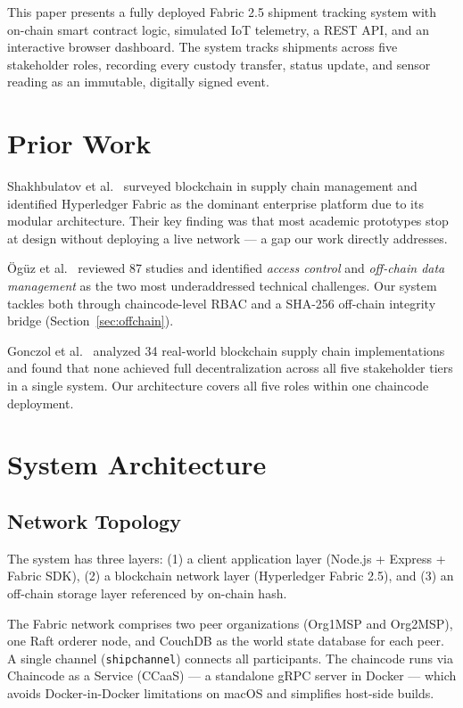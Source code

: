 \documentclass[conference]{IEEEtran}
\begin{document}
This paper presents a fully deployed Fabric 2.5 shipment tracking system
with on-chain smart contract logic, simulated IoT telemetry, a REST API,
and an interactive browser dashboard.  The system tracks shipments across
five stakeholder roles, recording every custody transfer, status update, and
sensor reading as an immutable, digitally signed event.

\section{Prior Work}

Shakhbulatov et al.\ \cite{shakhbulatov2020} surveyed blockchain in supply
chain management and identified Hyperledger Fabric as the dominant enterprise
platform due to its modular architecture.  Their key finding was that most
academic prototypes stop at design without deploying a live network --- a gap
our work directly addresses.

\"{O}g\"{u}z et al.\ \cite{oguz2024} reviewed 87 studies and identified
\textit{access control} and \textit{off-chain data management} as the two
most underaddressed technical challenges.  Our system tackles both through
chaincode-level RBAC and a SHA-256 off-chain integrity bridge
(Section~\ref{sec:offchain}).

Gonczol et al.\ \cite{gonczol2020} analyzed 34 real-world blockchain supply
chain implementations and found that none achieved full decentralization
across all five stakeholder tiers in a single system.  Our architecture
covers all five roles within one chaincode deployment.

\section{System Architecture}

\subsection{Network Topology}

The system has three layers: (1) a client application layer (Node.js +
Express + Fabric SDK), (2) a blockchain network layer (Hyperledger Fabric
2.5), and (3) an off-chain storage layer referenced by on-chain hash.

The Fabric network comprises two peer organizations (Org1MSP and Org2MSP),
one Raft orderer node, and CouchDB as the world state database for each
peer.  A single channel (\texttt{shipchannel}) connects all participants.
The chaincode runs via Chaincode as a Service (CCaaS) --- a standalone gRPC
server in Docker --- which avoids Docker-in-Docker limitations on macOS
and simplifies host-side builds.
\end{document}

